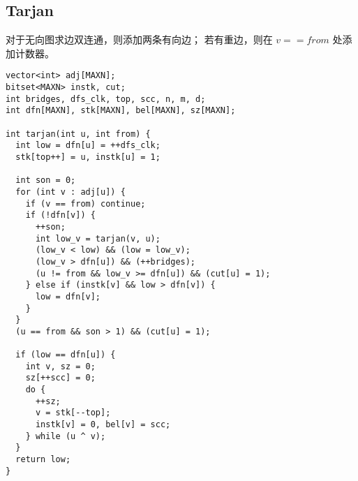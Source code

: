 \subsection{Tarjan}
对于无向图求边双连通，则添加两条有向边；
若有重边，则在 $v == from$ 处添加计数器。
\begin{lstlisting}
vector<int> adj[MAXN];
bitset<MAXN> instk, cut;
int bridges, dfs_clk, top, scc, n, m, d;
int dfn[MAXN], stk[MAXN], bel[MAXN], sz[MAXN];

int tarjan(int u, int from) {
  int low = dfn[u] = ++dfs_clk;
  stk[top++] = u, instk[u] = 1;

  int son = 0;
  for (int v : adj[u]) {
    if (v == from) continue;
    if (!dfn[v]) {
      ++son;
      int low_v = tarjan(v, u);
      (low_v < low) && (low = low_v);
      (low_v > dfn[u]) && (++bridges);
      (u != from && low_v >= dfn[u]) && (cut[u] = 1);
    } else if (instk[v] && low > dfn[v]) {
      low = dfn[v];
    }
  }
  (u == from && son > 1) && (cut[u] = 1);

  if (low == dfn[u]) {
    int v, sz = 0;
    sz[++scc] = 0;
    do {
      ++sz;
      v = stk[--top];
      instk[v] = 0, bel[v] = scc;
    } while (u ^ v);
  }
  return low;
}
\end{lstlisting}
